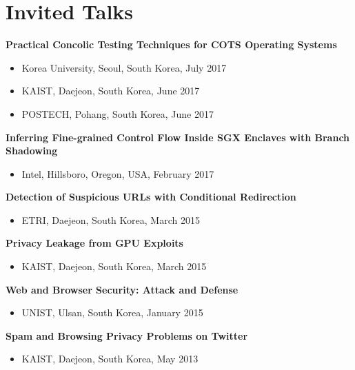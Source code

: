 \section*{Invited Talks}
\begin{description}
    \item \textbf{Practical Concolic Testing Techniques for COTS Operating Systems}
      \begin{itemize}
         \item Korea University, Seoul, South Korea, July 2017
         \item KAIST, Daejeon, South Korea, June 2017
         \item POSTECH, Pohang, South Korea, June 2017
      \end{itemize}

    \item \textbf{Inferring Fine-grained Control Flow Inside SGX Enclaves with Branch Shadowing}
      \begin{itemize}
          \item Intel, Hillsboro, Oregon, USA, February 2017
      \end{itemize}

    \item \textbf{Detection of Suspicious URLs with Conditional Redirection}
      \begin{itemize}
          \item ETRI, Daejeon, South Korea, March 2015
      \end{itemize}
      
    \item \textbf{Privacy Leakage from GPU Exploits}
      \begin{itemize}
          \item KAIST, Daejeon, South Korea, March 2015
      \end{itemize}

    \item \textbf{Web and Browser Security: Attack and Defense}
      \begin{itemize}
          \item UNIST, Ulsan, South Korea, January 2015
      \end{itemize}

    \item \textbf{Spam and Browsing Privacy Problems on Twitter}
      \begin{itemize}
          \item KAIST, Daejeon, South Korea, May 2013
      \end{itemize}
      
\end{description}
